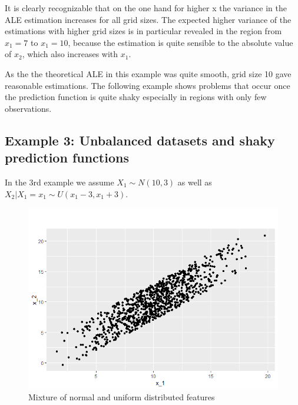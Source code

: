 \documentclass[
]{krantz}
\begin{document}
It is clearly recognizable that on the one hand for higher x the variance in the ALE estimation increases for all grid sizes. The expected higher variance of the estimations with higher grid sizes is in particular revealed in the region from \(x_1 = 7\) to \(x_1 = 10\), because the estimation is quite sensible to the absolute value of \(x_2\), which also increases with \(x_1\).

As the the theoretical ALE in this example was quite smooth, grid size 10 gave reasonable estimations. The following example shows problems that occur once the prediction function is quite shaky especially in regions with only few observations.

\hypertarget{example-3-unbalanced-datasets-and-shaky-prediction-functions}{%
\subsection{Example 3: Unbalanced datasets and shaky prediction functions}\label{example-3-unbalanced-datasets-and-shaky-prediction-functions}}

In the 3rd example we assume \(X_1 \sim N(10,3)\) as well as\\
\(X_2 \vert X_1 = x_1 \sim U(x_1 - 3, x_1 + 3 )\).

\begin{figure}
\includegraphics[width=1\linewidth]{images/ALE_2_dataset2_} \caption{Mixture of normal and uniform distributed features}\label{fig:datasetALE2}
\end{figure}
\end{document}
